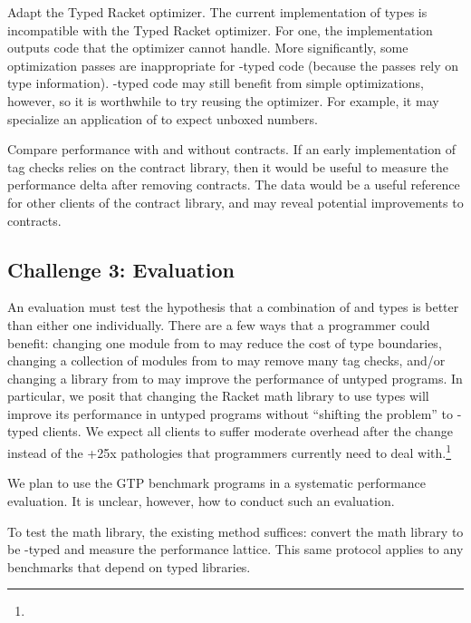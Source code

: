 Adapt the Typed Racket optimizer.
The current implementation of \tshallow{} types is incompatible with the Typed
Racket optimizer.
For one, the implementation outputs code that the optimizer cannot handle.
More significantly, some optimization passes are inappropriate for \tshallow{}-typed
code (because the passes rely on \tdeep{} type information).
\tShallow{}-typed code may still benefit from simple optimizations, however,
so it is worthwhile to try reusing the optimizer.
For example, it may specialize an application of \racketcode{+} to expect unboxed numbers.

Compare performance with and without contracts.
If an early implementation of \tshallow{} tag checks relies on the contract library,
then it would be useful to measure the performance delta after removing contracts.
The data would be a useful reference for other clients of the contract library,
and may reveal potential improvements to contracts.


\subsection{Challenge 3: Evaluation}


An evaluation must test the hypothesis that a combination of \tdeep{} and \tshallow{}
 types is better than either one individually.
There are a few ways that a programmer could benefit:
 changing one module from \tdeep{} to \tshallow{} may reduce the cost of type boundaries,
 changing a collection of modules from \tshallow{} to \tdeep{} may remove many tag checks,
 and/or changing a library from \tdeep{} to \tshallow{} may improve the performance of untyped programs.
In particular, we posit that changing the Racket math library to use \tshallow{}
types will improve its performance in untyped programs without ``shifting the problem''
to \tdeep{}-typed clients.
We expect all clients to suffer moderate overhead after the change instead
of the +25x pathologies that programmers currently need to deal with.\footnote{}

We plan to use the GTP benchmark programs in a systematic performance evaluation.
It is unclear, however, how to conduct such an evaluation.

To test the math library, the existing method suffices:
 convert the math library to be \tshallow{}-typed and measure the performance lattice.
This same protocol applies to any benchmarks that depend on typed libraries.

